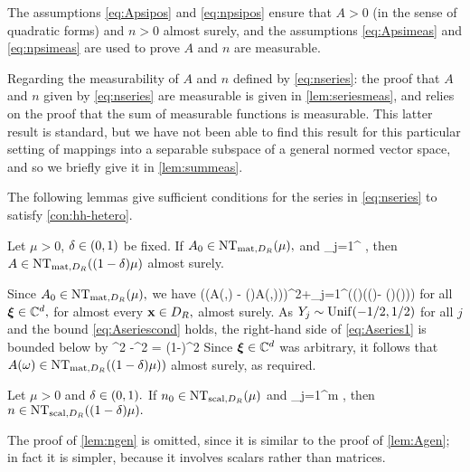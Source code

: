 The assumptions \eqref{eq:Apsipos} and \eqref{eq:npsipos} ensure that $A > 0$ (in the sense of quadratic forms) and $n > 0$  almost surely, and the assumptions \eqref{eq:Apsimeas} and \eqref{eq:npsimeas} are used to prove $A$ and $n$ are measurable.

Regarding the measurability of $A$ and $n$ defined by \eqref{eq:nseries}: the proof that $A$ and $n$ given by \eqref{eq:nseries} are measurable is given in \cref{lem:seriesmeas}, and relies on the proof that the sum of measurable functions
is measurable. This latter result is standard, but we have not been able to find this result for this particular setting of mappings
into a separable subspace of a general normed vector space, and so we briefly give it in \cref{lem:summeas}. 

The following lemmas give sufficient conditions for the series in \eqref{eq:nseries} to satisfy \cref{con:hh-hetero}.

\label{lem:Agen}
Let $\mu > 0$, $\delta \in \mleft(0,1\mright)$ be fixed. If $\Az \in \NTA{\mu},$ and
\beq\label{eq:Aseriescond}
\sum_{j=1}^\infty \NLiDRop{\Psij(\bx) - \mleft(\bx\cdot\grad\mright)\Psij(\bx)} \delta\mu,
\eeq
then $A \in \NTA{(1-\delta)\mu}$ almost surely.
\ele

Since $\Az \in \NTA{\mu},$ we have 
\beq\label{eq:Aseries1}
\Big(\mleft(A(\omega,\bx) - \mleft(\bx\cdot\grad\mright)A(\omega,\bx)\mright)\bxi\Big)\cdot\bxib \geq\mu \abs{\bxi}^2+\sum_{j=1}^\infty  \Big(\Yj(\omega)\mleft(\Psij(\bx)- \mleft(\bx\cdot\grad\mright)\Psij(\bx)\mright)\bxi\Big)\cdot\bxib
\eeq
for all $\boldsymbol{\xi} \in \mathbb C^{d},$ for almost every $\mathbf{x} \in D_{R},$ almost surely. As $Y_{j} \sim \mathrm{Unif}(-1/2,1/2)$ for all $j$ and the bound \eqref{eq:Aseriescond} holds, the right-hand side of \eqref{eq:Aseries1} is bounded below by
\beqs
\mu \abs{\bxi}^2 -\delta \mu \abs{\bxi}^2 = (1-\delta)\mu\abs{\bxi}^2
\eeqs
Since $\boldsymbol{\xi} \in \mathbb C^{d}$ was arbitrary, it follows that $A(\omega) \in \NTA{(1-\delta)\mu)}$ almost surely, as required.
\epf

\label{lem:ngen}
Let $\mu > 0$ and $\delta \in \mleft(0,1\mright).$ If $\nz \in \NTn{\mu}$ and
\beq\label{eq:nseriescond}
\sum_{j=1}^m\NLiDRRR{\psij(\bx) + \bx\cdot\grad\psij(\bx)} \delta\mu,
\eeq
then $n \in \NTn{(1-\delta)\mu}.$
\ele

The proof of \cref{lem:ngen} is omitted, since it is similar to the proof of \cref{lem:Agen}; in fact it is simpler, because it involves scalars rather than matrices.
